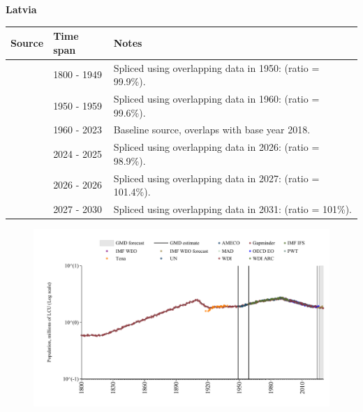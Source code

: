 \documentclass[12pt,a4paper,landscape]{article}
\begin{document}
\begin{adjustbox}{max totalsize={\paperwidth}{\paperheight},center}
\begin{minipage}[t][\textheight][t]{\textwidth}
\vspace*{0.5cm}
{}
\begin{center}
{\Large\bfseries Latvia}
\end{center}
\vspace{0.5cm}
\begin{table}[H]
\centering
\small
\begin{tabular}{|l|l|l|}
\hline
\textbf{Source} & \textbf{Time span} & \textbf{Notes} \\
\hline
\rowcolor{white}\cite{Gapminder}& 1800 - 1949 &Spliced using overlapping data in 1950: (ratio = 99.9\%).\\
\rowcolor{lightgray}\cite{IMF_IFS}& 1950 - 1959 &Spliced using overlapping data in 1960: (ratio = 99.6\%).\\
\rowcolor{white}\cite{WDI}& 1960 - 2023 &Baseline source, overlaps with base year 2018.\\
\rowcolor{lightgray}\cite{OECD_EO}& 2024 - 2025 &Spliced using overlapping data in 2026: (ratio = 98.9\%).\\
\rowcolor{white}\cite{AMECO}& 2026 - 2026 &Spliced using overlapping data in 2027: (ratio = 101.4\%).\\
\rowcolor{lightgray}\cite{Gapminder}& 2027 - 2030 &Spliced using overlapping data in 2031: (ratio = 101\%).\\
\hline
\end{tabular}
\end{table}
\begin{figure}[H]
\centering
\includegraphics[width=\textwidth,height=0.6\textheight,keepaspectratio]{graphs/LVA_pop.pdf}
\end{figure}
\end{minipage}
\end{adjustbox}
\end{document}
